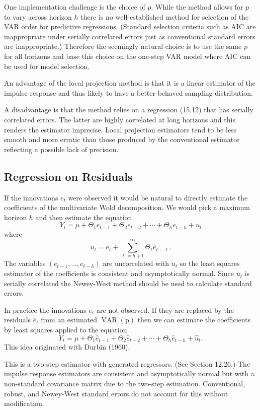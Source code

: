 \documentclass[10pt]{article}
\begin{document}
One implementation challenge is the choice of $p$. While the method allows for $p$ to vary across horizon $h$ there is no well-established method for selection of the VAR order for predictive regressions. (Standard selection criteria such as AIC are inappropriate under serially correlated errors just as conventional standard errors are inappropriate.) Therefore the seemingly natural choice is to use the same $p$ for all horizons and base this choice on the one-step VAR model where AIC can be used for model selection.

An advantage of the local projection method is that it is a linear estimator of the impulse response and thus likely to have a better-behaved sampling distribution.

A disadvantage is that the method relies on a regression (15.12) that has serially correlated errors. The latter are highly correlated at long horizons and this renders the estimator imprecise. Local projection estimators tend to be less smooth and more erratic than those produced by the conventional estimator reflecting a possible lack of precision.

\subsection{Regression on Residuals}
If the innovations $e_{t}$ were observed it would be natural to directly estimate the coefficients of the multivariate Wold decomposition. We would pick a maximum horizon $h$ and then estimate the equation
$$
Y_{t}=\mu+\Theta_{1} e_{t-1}+\Theta_{2} e_{t-2}+\cdots+\Theta_{h} e_{t-h}+u_{t}
$$
where
$$
u_{t}=e_{t}+\sum_{\ell=h+1}^{\infty} \Theta_{\ell} e_{t-\ell} .
$$
The variables $\left(e_{t-1}, \ldots, e_{t-h}\right)$ are uncorrelated with $u_{t}$ so the least squares estimator of the coefficients is consistent and asymptotically normal. Since $u_{t}$ is serially correlated the Newey-West method should be used to calculate standard errors.

In practice the innovations $e_{t}$ are not observed. If they are replaced by the residuals $\widehat{e}_{t}$ from an estimated $\operatorname{VAR}(\mathrm{p})$ then we can estimate the coefficients by least squares applied to the equation
$$
Y_{t}=\mu+\Theta_{1} \widehat{e}_{t-1}+\Theta_{2} \widehat{e}_{t-2}+\cdots+\Theta_{h} \widehat{e}_{t-h}+\widehat{u}_{t} .
$$
This idea originated with Durbin (1960).

This is a two-step estimator with generated regressors. (See Section 12.26.) The impulse response estimators are consistent and asymptotically normal but with a non-standard covariance matrix due to the two-step estimation. Conventional, robust, and Newey-West standard errors do not account for this without modification.
\end{document}
